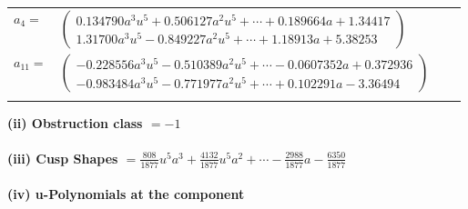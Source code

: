 \documentclass[1p]{elsarticle_modified}
\theoremstyle{definition}
\begin{document}
\begin{tabular}{m{7pt} m{180pt} m{7pt} m{180pt} }
\flushright $a_{4}=$&$\begin{pmatrix}0.134790 a^{3} u^{5}+0.506127 a^{2} u^{5}+\cdots+0.189664 a+1.34417\\1.31700 a^{3} u^{5}-0.849227 a^{2} u^{5}+\cdots+1.18913 a+5.38253\end{pmatrix}$ \\
\flushright $a_{11}=$&$\begin{pmatrix}-0.228556 a^{3} u^{5}-0.510389 a^{2} u^{5}+\cdots-0.0607352 a+0.372936\\-0.983484 a^{3} u^{5}-0.771977 a^{2} u^{5}+\cdots+0.102291 a-3.36494\end{pmatrix}$\\&\end{tabular}
\flushleft \textbf{(ii) Obstruction class $= -1$}\\~\\
\flushleft \textbf{(iii) Cusp Shapes $= \frac{808}{1877} u^5 a^3+\frac{4132}{1877} u^5 a^2+\cdots-\frac{2988}{1877} a-\frac{6350}{1877}$}\\~\\
\newpage\renewcommand{\arraystretch}{1}
\flushleft \textbf{(iv) u-Polynomials at the component}\newline \\
\end{document}
